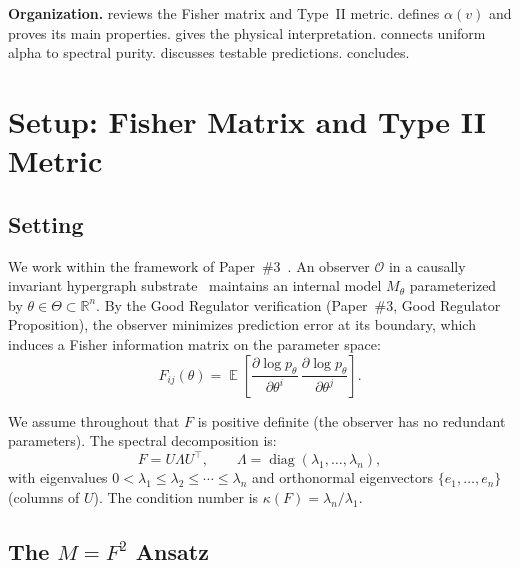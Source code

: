 \documentclass[11pt,a4paper]{article}
\theoremstyle{plain}
\theoremstyle{definition}
\DeclareMathOperator{\diag}{diag}
\DeclareMathOperator{\Exp}{\mathbb{E}}
\newcommand{\R}{\mathbb{R}}
\newcommand{\Ocal}{\mathcal{O}}
\begin{document}
\textbf{Organization.}   reviews the Fisher matrix
and Type~II metric.   defines $\alpha(v)$
and proves its main properties.   gives the
physical interpretation.   connects uniform
alpha to spectral purity.   discusses
testable predictions.   concludes.



\section{Setup: Fisher Matrix and Type II Metric}
\label{sec:setup}

\subsection{Setting}

We work within the framework of Paper~\#3~\cite{companion_amari}.
An observer $\Ocal$ in a causally invariant hypergraph
substrate~\cite{wolfram2020ruliad} maintains an internal model
$M_\theta$ parameterized by $\theta \in \Theta \subset \R^n$.
By the Good Regulator verification (Paper~\#3, Good Regulator Proposition),
the observer minimizes prediction error at its boundary, which
induces a Fisher information matrix on the parameter space:
\begin{equation}
\label{eq:fisher_def}
F_{ij}(\theta) = \Exp\!\left[
  \frac{\partial \log p_\theta}{\partial \theta^i}\,
  \frac{\partial \log p_\theta}{\partial \theta^j}
\right].
\end{equation}

We assume throughout that $F$ is positive definite (the observer has
no redundant parameters).  The spectral decomposition is:
\begin{equation}
\label{eq:spectral}
F = U \Lambda U^\top, \qquad
\Lambda = \diag(\lambda_1, \ldots, \lambda_n),
\end{equation}
with eigenvalues $0 < \lambda_1 \leq \lambda_2 \leq \cdots \leq
\lambda_n$ and orthonormal eigenvectors $\{e_1, \ldots, e_n\}$
(columns of $U$).  The condition number is
$\kappa(F) = \lambda_n / \lambda_1$.

\subsection{The \texorpdfstring{$M = F^2$}{M = F-squared} Ansatz}
\end{document}
